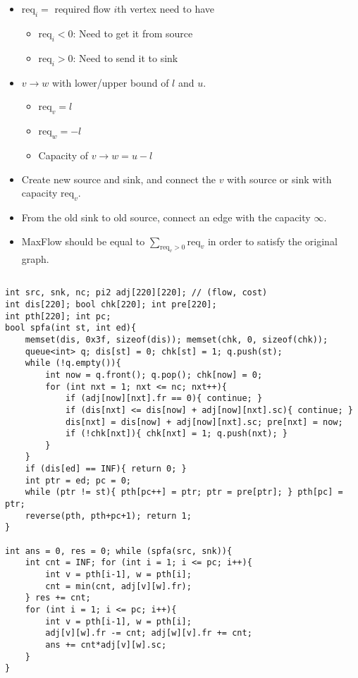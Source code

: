 \documentclass[landscape, 8pt, a4paper, oneside, twocolumn]{extarticle}
\begin{document}
\subsection{}
\begin{itemize}
	\item $\mathrm{req}_i = $ required flow $i$th vertex need to have
		\begin{itemize}
		\item $\mathrm{req}_i < 0$: Need to get it from source
		\item $\mathrm{req}_i > 0$: Need to send it to sink
		\end{itemize}
	\item $v \rightarrow w$ with lower/upper bound of $l$ and $u$.
		\begin{itemize}
		\item $\mathrm{req}_v = l$
		\item $\mathrm{req}_w = -l$
		\item Capacity of $v \rightarrow w = u-l$
		\end{itemize}
	\item Create new source and sink, and connect the $v$ with source or sink with capacity $\mathrm{req}_v$.
	\item From the old sink to old source, connect an edge with the capacity $\infty$.
	\item MaxFlow should be equal to $\sum\limits_{\mathrm{req}_v > 0} \mathrm{req}_v$ in order to satisfy the original graph.
\end{itemize}
\subsection{}
\begin{verbatim}
int src, snk, nc; pi2 adj[220][220]; // (flow, cost)
int dis[220]; bool chk[220]; int pre[220];
int pth[220]; int pc;
bool spfa(int st, int ed){
    memset(dis, 0x3f, sizeof(dis)); memset(chk, 0, sizeof(chk));
    queue<int> q; dis[st] = 0; chk[st] = 1; q.push(st);
    while (!q.empty()){
        int now = q.front(); q.pop(); chk[now] = 0;
        for (int nxt = 1; nxt <= nc; nxt++){
            if (adj[now][nxt].fr == 0){ continue; }
            if (dis[nxt] <= dis[now] + adj[now][nxt].sc){ continue; }
            dis[nxt] = dis[now] + adj[now][nxt].sc; pre[nxt] = now;
            if (!chk[nxt]){ chk[nxt] = 1; q.push(nxt); }
        }
    }
    if (dis[ed] == INF){ return 0; }
    int ptr = ed; pc = 0;
    while (ptr != st){ pth[pc++] = ptr; ptr = pre[ptr]; } pth[pc] = ptr;
    reverse(pth, pth+pc+1); return 1;
}

int ans = 0, res = 0; while (spfa(src, snk)){
    int cnt = INF; for (int i = 1; i <= pc; i++){
        int v = pth[i-1], w = pth[i];
        cnt = min(cnt, adj[v][w].fr);
    } res += cnt;
    for (int i = 1; i <= pc; i++){
        int v = pth[i-1], w = pth[i];
        adj[v][w].fr -= cnt; adj[w][v].fr += cnt;
        ans += cnt*adj[v][w].sc;
    }
}
\end{verbatim}
\end{document}
